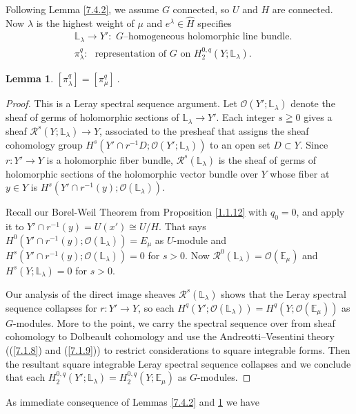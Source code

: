 \documentclass{conm-p-l}
\newtheorem{lemma}[equation]{Lemma}
\newcommand{\cO}{\mathcal{O}}
\def\E{\mathbb{E}}
\def\L{\mathbb{L}}
\def\cO{\mathcal{O}}
\def\cR{\mathcal{R}}
\begin{document}
Following Lemma \ref{7.4.2}, we assume $G$ connected, so $U$ and $H$ are
connected.  Now $\lambda$ is the highest weight of $\mu$ and $e^\lambda 
\in \widehat{H}$ specifies
\begin{equation}\label{7.5.2}
\begin{aligned}
&\L_\lambda \to Y':\,\, G\text{--homogeneous holomorphic line bundle.} \\
&\pi_\lambda^q:\,\, \text{ representation of } G \text{ on } H_2^{0,q}
	(Y;\L_\lambda). 
\end{aligned}
\end{equation}
\begin{lemma}\label{7.5.3}
$[\pi_\lambda^q] = [\pi_\mu^q]$\,.
\end{lemma}
\begin{proof}
This is a Leray spectral sequence argument.
Let $\cO(Y';\L_\lambda)$ denote the sheaf of germs of holomorphic sections of
$\L_\lambda \to Y'$.  Each integer $s \geqq 0$ gives a sheaf 
$\cR^s(Y;\L_\lambda) \to Y$, associated to the presheaf that assigns the
sheaf cohomology group $H^s(Y' \cap r^{-1}D; \cO(Y';\L_\lambda))$ to
an open set $D \subset Y$.  Since $r: Y' \to Y$ is a holomorphic fiber
bundle, $\cR^s(\L_\lambda)$ is the sheaf of germs of holomorphic
sections of the holomorphic vector bundle over $Y$ whose fiber at
$y \in Y$ is $H^s(Y' \cap r^{-1}(y); \cO(\L_\lambda))$.

Recall our 
Borel-Weil Theorem from Proposition \ref{1.1.12} with $q_0 = 0$, and
apply it to $Y' \cap r^{-1}(y) = U(x') \cong U/H$.  That says
$H^0(Y' \cap r^{-1}(y); \cO(\L_\lambda)) = E_\mu$ as $U$-module and
$H^s(Y' \cap r^{-1}(y); \cO(\L_\lambda)) = 0$ for $s > 0$.  Now
$\cR^0(\L_\lambda) = \cO(\E_\mu)$ and $H^s(Y;\L_\lambda) = 0$ for $s > 0$.

Our analysis of the direct image sheaves $\cR^s(\L_\lambda)$ shows that
the Leray spectral sequence collapses for $r: Y' \to Y$, so each
$H^q(Y';\cO(\L_\lambda)) = H^q(Y;\cO(\E_\mu))$ as $G$-modules.  More
to the point, we carry the spectral sequence over from sheaf cohomology
to Dolbeault cohomology and use the Andreotti--Vesentini theory 
((\ref{7.1.8}) and (\ref{7.1.9}))
to restrict considerations to square integrable forms.  Then the
resultant square integrable Leray spectral sequence collapses and we
conclude that each $H_2^{0,q}(Y';\L_\lambda) = H_2^{0,q}(Y;\E_\mu)$
as $G$-modules.  
\end{proof}

As immediate consequence of Lemmas \ref{7.4.2} and \ref{7.5.3} we have
\end{document}
